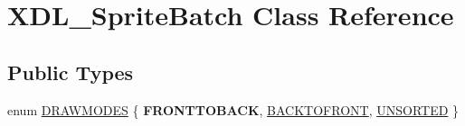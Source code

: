 \hypertarget{class_x_d_l___sprite_batch}{\section{X\-D\-L\-\_\-\-Sprite\-Batch Class Reference}
\label{class_x_d_l___sprite_batch}
}
\subsection*{Public Types}
\begin{DoxyCompactItemize}
\item 
enum \hyperlink{class_x_d_l___sprite_batch_a0dba0557842cdf21917adc2ef44125e6}{D\-R\-A\-W\-M\-O\-D\-E\-S} \{ {\bfseries F\-R\-O\-N\-T\-T\-O\-B\-A\-C\-K}, 
\hyperlink{class_x_d_l___sprite_batch_a0dba0557842cdf21917adc2ef44125e6af0aff02dad6d665eb8a61c108e5ca1d1}{B\-A\-C\-K\-T\-O\-F\-R\-O\-N\-T}, 
\hyperlink{class_x_d_l___sprite_batch_a0dba0557842cdf21917adc2ef44125e6a4dea32cd64020138077648d29c34f58a}{U\-N\-S\-O\-R\-T\-E\-D}
 \}
\end{DoxyCompactItemize}
